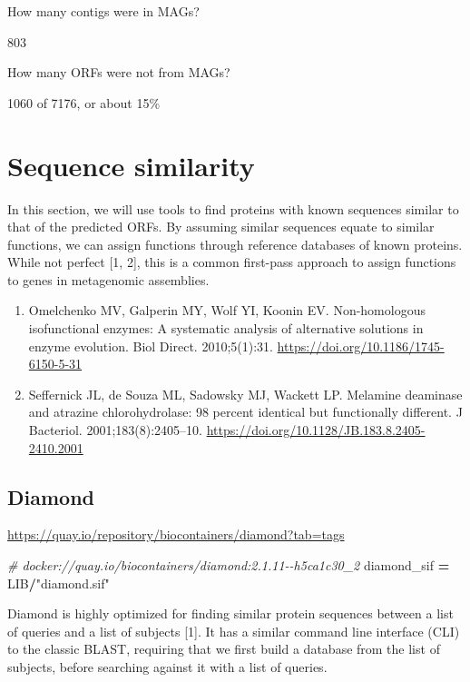 \documentclass[
]{book}
\newenvironment{Shaded}{\begin{snugshade}}{\end{snugshade}}
\newcommand{\CommentTok}[1]{\textcolor[rgb]{0.56,0.35,0.01}{\textit{#1}}}
\newcommand{\NormalTok}[1]{#1}
\newcommand{\OperatorTok}[1]{\textcolor[rgb]{0.81,0.36,0.00}{\textbf{#1}}}
\newcommand{\StringTok}[1]{\textcolor[rgb]{0.31,0.60,0.02}{#1}}
\providecommand{\tightlist}{%
  \setlength{\itemsep}{0pt}\setlength{\parskip}{0pt}}
\begin{document}
How many contigs were in MAGs?

803

How many ORFs were not from MAGs?

1060 of 7176, or about 15\%

\section{Sequence similarity}\label{sequence-similarity}

In this section, we will use tools to find proteins with known sequences similar to that of the predicted ORFs.
By assuming similar sequences equate to similar functions, we can assign functions through reference databases of known proteins.
While not perfect {[}1, 2{]}, this is a common first-pass approach to assign functions to genes in metagenomic assemblies.

\begin{enumerate}
\def\labelenumi{\arabic{enumi}.}
\tightlist
\item
  Omelchenko MV, Galperin MY, Wolf YI, Koonin EV. Non-homologous isofunctional enzymes: A systematic analysis of alternative solutions in enzyme evolution. Biol Direct. 2010;5(1):31. \url{https://doi.org/10.1186/1745-6150-5-31}
\item
  Seffernick JL, de Souza ML, Sadowsky MJ, Wackett LP. Melamine deaminase and atrazine chlorohydrolase: 98 percent identical but functionally different. J Bacteriol. 2001;183(8):2405--10. \url{https://doi.org/10.1128/JB.183.8.2405-2410.2001}
\end{enumerate}

\subsection{Diamond}\label{diamond}

\url{https://quay.io/repository/biocontainers/diamond?tab=tags}

\begin{Shaded}
\begin{Highlighting}[numbers=left,,]
\CommentTok{\# docker://quay.io/biocontainers/diamond:2.1.11{-}{-}h5ca1c30\_2}
\NormalTok{diamond\_sif }\OperatorTok{=}\NormalTok{ LIB}\OperatorTok{/}\StringTok{"diamond.sif"}
\end{Highlighting}
\end{Shaded}

Diamond is highly optimized for finding similar protein sequences between a list of queries and a list of subjects {[}1{]}.
It has a similar command line interface (CLI) to the classic BLAST, requiring that we first build a database from the list of subjects,
before searching against it with a list of queries.
\end{document}
